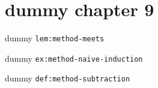 \clearpage\begingroup\small
\setcounter{chapter}{9}\addtocounter{chapter}{-1}
\chapter{dummy chapter 9}
\begin{lemma}\label{lem:method-meets}dummy \texttt{lem:method-meets}\end{lemma}
\begin{example}\label{ex:method-naive-induction}dummy \texttt{ex:method-naive-induction}\end{example}
\begin{definition}\label{def:method-subtraction}dummy \texttt{def:method-subtraction}\end{definition}
\endgroup
